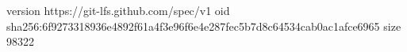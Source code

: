 version https://git-lfs.github.com/spec/v1
oid sha256:6f9273318936e4892f61a4f3e96f6e4e287fec5b7d8c64534cab0ac1afce6965
size 98322
